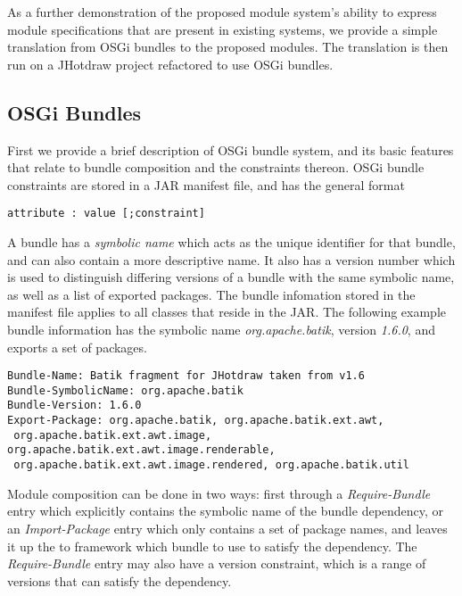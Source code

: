 As a further demonstration of the proposed module system's ability to 
express module specifications that are present in existing systems, 
we provide a simple translation from OSGi bundles to the proposed modules.
The translation is then run on a JHotdraw project refactored to use
OSGi bundles.

\subsection{OSGi Bundles}

First we provide a brief description of OSGi bundle system, and its basic
features that relate to bundle composition and the constraints thereon.
OSGi bundle constraints are stored in a JAR manifest file, and has the
general format

\begin{lstlisting}
attribute : value [;constraint]
\end{lstlisting}

A bundle has a \textit{symbolic name} which acts as the unique identifier for that bundle, 
and can also contain a more descriptive name.
It also has a version number which is used to distinguish differing versions of
a bundle with the same symbolic name, as well as a list of exported packages.
 The bundle infomation stored in the
manifest file applies to all classes that reside in the JAR. The following example
bundle information has the symbolic name \textit{org.apache.batik}, version \textit{1.6.0},
and exports a set of packages.

\begin{lstlisting}[caption=Basic OSGi bundle]
Bundle-Name: Batik fragment for JHotdraw taken from v1.6
Bundle-SymbolicName: org.apache.batik
Bundle-Version: 1.6.0
Export-Package: org.apache.batik, org.apache.batik.ext.awt,
 org.apache.batik.ext.awt.image, org.apache.batik.ext.awt.image.renderable,
 org.apache.batik.ext.awt.image.rendered, org.apache.batik.util
\end{lstlisting}

Module composition can be done in two ways: first through a \textit{Require-Bundle}
entry which explicitly contains the symbolic name of the bundle dependency, or an
\textit{Import-Package} entry which only contains a set of package names, and leaves
it up the to framework which bundle to use to satisfy the dependency. The \textit{Require-Bundle}
entry may also have a version constraint, which is a range of versions that can satisfy
the dependency.

